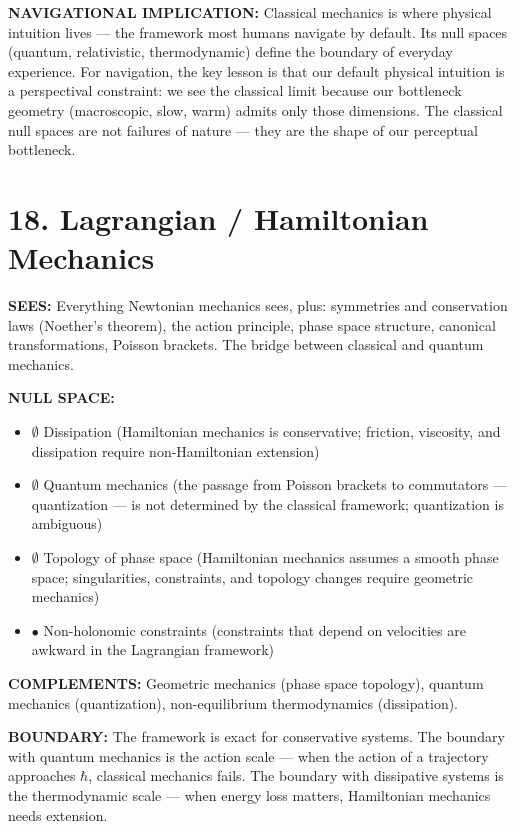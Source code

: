 \textbf{NAVIGATIONAL IMPLICATION:} Classical mechanics is where physical intuition lives — the framework most humans navigate by default. Its null spaces (quantum, relativistic, thermodynamic) define the boundary of everyday experience. For navigation, the key lesson is that our default physical intuition is a perspectival constraint: we see the classical limit because our bottleneck geometry (macroscopic, slow, warm) admits only those dimensions. The classical null spaces are not failures of nature — they are the shape of our perceptual bottleneck.


\bigskip\noindent\makebox[\textwidth]{\color{rulegray}\rule{5cm}{0.3pt}}\bigskip


\section*{18. Lagrangian / Hamiltonian Mechanics}


\textbf{SEES:} Everything Newtonian mechanics sees, plus: symmetries and conservation laws (Noether's theorem), the action principle, phase space structure, canonical transformations, Poisson brackets. The bridge between classical and quantum mechanics.


\textbf{NULL SPACE:}

\begin{itemize}[nosep,leftmargin=*]
  \item $\emptyset$ Dissipation (Hamiltonian mechanics is conservative; friction, viscosity, and dissipation require non-Hamiltonian extension)
  \item $\emptyset$ Quantum mechanics (the passage from Poisson brackets to commutators — quantization — is not determined by the classical framework; quantization is ambiguous)
  \item $\emptyset$ Topology of phase space (Hamiltonian mechanics assumes a smooth phase space; singularities, constraints, and topology changes require geometric mechanics)
  \item $\bullet$ Non-holonomic constraints (constraints that depend on velocities are awkward in the Lagrangian framework)
\end{itemize}


\textbf{COMPLEMENTS:} Geometric mechanics (phase space topology), quantum mechanics (quantization), non-equilibrium thermodynamics (dissipation).


\textbf{BOUNDARY:} The framework is exact for conservative systems. The boundary with quantum mechanics is the action scale — when the action of a trajectory approaches $\hbar$, classical mechanics fails. The boundary with dissipative systems is the thermodynamic scale — when energy loss matters, Hamiltonian mechanics needs extension.


